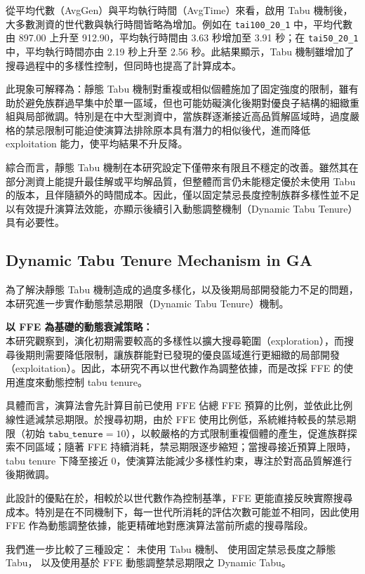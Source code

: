 \documentclass[conference]{IEEEtran}
\begin{document}
從平均代數（AvgGen）與平均執行時間（AvgTime）來看，啟用 Tabu 機制後，大多數測資的世代數與執行時間皆略為增加。例如在 \texttt{tai100\_20\_1} 中，平均代數由 897.00 上升至 912.90，平均執行時間由 3.63 秒增加至 3.91 秒；在 \texttt{tai50\_20\_1} 中，平均執行時間亦由 2.19 秒上升至 2.56 秒。此結果顯示，Tabu 機制雖增加了搜尋過程中的多樣性控制，但同時也提高了計算成本。

此現象可解釋為：靜態 Tabu 機制對重複或相似個體施加了固定強度的限制，雖有助於避免族群過早集中於單一區域，但也可能妨礙演化後期對優良子結構的細緻重組與局部微調。特別是在中大型測資中，當族群逐漸接近高品質解區域時，過度嚴格的禁忌限制可能迫使演算法排除原本具有潛力的相似後代，進而降低 exploitation 能力，使平均結果不升反降。

綜合而言，靜態 Tabu 機制在本研究設定下僅帶來有限且不穩定的改善。雖然其在部分測資上能提升最佳解或平均解品質，但整體而言仍未能穩定優於未使用 Tabu 的版本，且伴隨額外的時間成本。因此，僅以固定禁忌長度控制族群多樣性並不足以有效提升演算法效能，亦顯示後續引入動態調整機制（Dynamic Tabu Tenure）具有必要性。


\subsection{Dynamic Tabu Tenure Mechanism in GA}
為了解決靜態 Tabu 機制造成的過度多樣化，以及後期局部開發能力不足的問題，本研究進一步實作動態禁忌期限（Dynamic Tabu Tenure）機制。

\textbf{以 FFE 為基礎的動態衰減策略：} \\
本研究觀察到，演化初期需要較高的多樣性以擴大搜尋範圍（exploration），而搜尋後期則需要降低限制，讓族群能對已發現的優良區域進行更細緻的局部開發（exploitation）。因此，本研究不再以世代數作為調整依據，而是改採 FFE 的使用進度來動態控制 tabu tenure。

具體而言，演算法會先計算目前已使用 FFE 佔總 FFE 預算的比例，並依此比例線性遞減禁忌期限。於搜尋初期，由於 FFE 使用比例低，系統維持較長的禁忌期限（初始 $\texttt{tabu\_tenure}=10$），以較嚴格的方式限制重複個體的產生，促進族群探索不同區域；隨著 FFE 持續消耗，禁忌期限逐步縮短；當搜尋接近預算上限時，tabu tenure 下降至接近 0，使演算法能減少多樣性約束，專注於對高品質解進行後期微調。

此設計的優點在於，相較於以世代數作為控制基準，FFE 更能直接反映實際搜尋成本。特別是在不同機制下，每一世代所消耗的評估次數可能並不相同，因此使用 FFE 作為動態調整依據，能更精確地對應演算法當前所處的搜尋階段。

我們進一步比較了三種設定：
未使用 Tabu 機制、
使用固定禁忌長度之靜態 Tabu，
以及使用基於 FFE 動態調整禁忌期限之 Dynamic Tabu。
\end{document}
